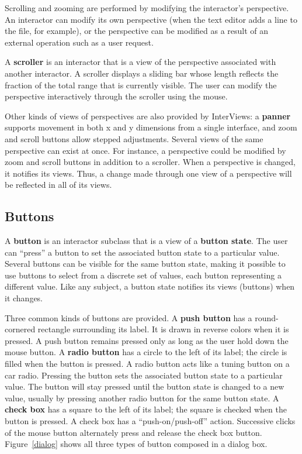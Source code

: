 Scrolling and zooming are performed by modifying the interactor's
perspective.  An interactor can modify its own perspective (when
the text editor adds a line to the file, for example),
or the perspective can be modified
as a result of an external operation such as a user request.

A {\bf scroller} is an interactor that
is a view of the perspective associated with
another interactor.
A scroller displays a sliding bar whose length reflects
the fraction of the total range
that is currently visible.
The user can modify the perspective interactively through the scroller
using the mouse.

Other kinds of views of perspectives are also provided by InterViews:
a {\bf panner} supports movement in both x and y dimensions
from a single interface, and zoom and scroll buttons allow stepped
adjustments.
Several views of the same perspective can exist at once.  For instance, a
perspective could be modified by zoom and scroll buttons in addition to
a scroller.
When a perspective is changed, it notifies its views.  Thus, a change made
through one view of a perspective will be reflected in all of its views.

\subsection{Buttons}
A {\bf button} is an interactor subclass that
is a view of a {\bf button state}.
The user can ``press'' a button to set the associated button state
to a particular value.
Several buttons can be visible for the same
button state, making it possible to use buttons
to select from a discrete set of values, each button representing
a different value.
Like any subject,
a button state notifies its views (buttons) when it changes.

Three common kinds of buttons are provided.
A {\bf push button} has a round-cornered rectangle
surrounding its label.
It is drawn in reverse colors when it is pressed.  A push button remains
pressed only as long as the user hold down the mouse button.
A {\bf radio button} has a circle to the left of its label;
the circle is filled when the button is pressed.  A radio button acts like
a tuning button on a car radio.  Pressing the button sets the associated
button state to a particular value.  The button will stay pressed until the
button state is changed to a new value, usually by pressing another radio
button for the same button state.
A {\bf check box} has a square to the left of its label;
the square is checked when the button is pressed.
A check box has a ``push-on/push-off'' action.  Successive clicks of the
mouse button alternately press and release the check box button.
Figure~\ref{dialog} shows all three types of button composed in a
dialog box.

